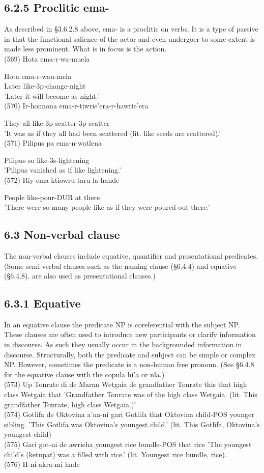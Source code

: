 \documentclass[10pt]{article}
\begin{document}
\subsection*{6.2.5 Proclitic ema-}
As described in §3.6.2.8 above, ema- is a proclitic on verbs. It is a type of passive in that the functional salience of the actor and even undergoer to some extent is made less prominent. What is in focus is the action.\\
(569) Hota ema-r-wa-muela

Hota ema-r-wau-mela\\
Later like-3p-change-night\\
'Later it will become as night.'\\
(570) Ir-honnona ema-r-tiwrie'era-r-hawrie'era

They-all like-3p-scatter-3p-scatter\\
'It was as if they all had been scattered (lit. like seeds are scattered).'\\
(571) Pilipus pa ema-n-watlena

Pilipus so like-3s-lightening\\
'Pilipus vanished as if like lightening.'\\
(572) Riy ema-ktiowru-taru la hande

People like-pour-DUR at there\\
'There were so many people like as if they were poured out there.'

\subsection*{6.3 Non-verbal clause}
The non-verbal clauses include equative, quantifier and presentational predicates. (Some semi-verbal clauses such as the naming clause (§6.4.4) and equative (§6.4.8). are also used as presentational clauses.)

\subsection*{6.3.1 Equative}
In an equative clause the predicate NP is coreferential with the subject NP. These clauses are often used to introduce new participants or clarify information in discourse. As such they usually occur in the backgrounded information in discourse. Structurally, both the predicate and subject can be simple or complex NP. However, sometimes the predicate is a non-human free pronoun. (See §6.4.8 for the equative clause with the copula hi'a or nla.)\\
(573) Up Tonrate di de Maran Wetgaia de grandfather Tonrate this that high class Wetgaia that 'Grandfather Tonrate was of the high class Wetgaia. (lit. This grandfather Tonrate, high class Wetgaia.)'\\
(574) Gotlifa de Oktovina a'na-ni gari Gotlifa that Oktovina child-POS younger sibling. 'This Gotlifa was Oktovina's youngest child.' (lit. This Gotlifa, Oktovina's youngest child)\\
(575) Gari got-ni de awrieha youngest rice bundle-POS that rice 'The youngest child's (ketupat) was a filled with rice.' (lit. Youngest rice bundle, rice).\\
(576) H-ni-akra-mi hade
\end{document}
